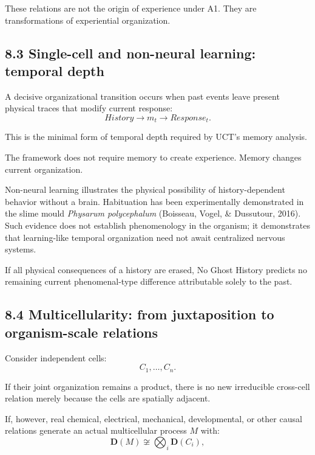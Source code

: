\documentclass[
  11pt,
  a4paper,
]{article}
\begin{document}
These relations are not the origin of experience under A1. They are
transformations of experiential organization.

\hypertarget{single-cell-and-non-neural-learning-temporal-depth}{%
\subsection{8.3 Single-cell and non-neural learning: temporal
depth}\label{single-cell-and-non-neural-learning-temporal-depth}}

A decisive organizational transition occurs when past events leave
present physical traces that modify current response:
\nopagebreak[4]
\[
History
\to
m_t
\to
Response_t.
\]

This is the minimal form of temporal depth required by UCT's memory
analysis.

The framework does not require memory to create experience. Memory
changes current organization.

Non-neural learning illustrates the physical possibility of
history-dependent behavior without a brain. Habituation has been
experimentally demonstrated in the slime mould \emph{Physarum
polycephalum} (Boisseau, Vogel, \& Dussutour, 2016). Such evidence does
not establish phenomenology in the organism; it demonstrates that
learning-like temporal organization need not await centralized nervous
systems.

If all physical consequences of a history are erased, No Ghost History
predicts no remaining current phenomenal-type difference attributable
solely to the past.

\hypertarget{multicellularity-from-juxtaposition-to-organism-scale-relations}{%
\subsection{8.4 Multicellularity: from juxtaposition to organism-scale
relations}\label{multicellularity-from-juxtaposition-to-organism-scale-relations}}

Consider independent cells:
\nopagebreak[4]
\[
C_1,\ldots,C_n.
\]

If their joint organization remains a product, there is no new
irreducible cross-cell relation merely because the cells are spatially
adjacent.

If, however, real chemical, electrical, mechanical, developmental, or
other causal relations generate an actual multicellular process \(M\)
with:
\nopagebreak[4]
\[
\mathbf D(M)
\not\cong
\bigotimes_i
\mathbf D(C_i),
\]
\end{document}
